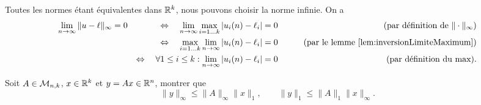 \proof
Toutes les normes étant équivalentes dans $\mathbb{R}^k$, nous pouvons choisir la norme infinie.
On a
\begin{align*}
  \lim_{n \to \infty} \|u - \ell\|_\infty & = 0 & 
  \Leftrightarrow \quad \lim_{n \to \infty} \max_{i=1 \dots k} |u_i(n) - \ell_i| & = 0 & \qquad \text{(par définition de $\|\cdot\|_\infty$)} \\
  & & \Leftrightarrow  \quad \max_{i=1 \dots k} \lim_{n \to \infty} |u_i(n) - \ell_i| & = 0 & \qquad \text{(par le lemme \ref{lem:inversionLimiteMaximum})} \\
  & & \Leftrightarrow  \quad \forall 1 \leq i \leq k: \lim_{n \to \infty} |u_i(n) - \ell_i| & = 0 & 
  \qquad \text{(par définition du max)}.
\end{align*}
\eproof

\begin{proposition} \label{prop:normeProduitMatriceVecteur}
  Soit $A \in \mathcal{M}_{n, k}$, $x \in \mathbb{R}^k$ et $y = Ax \in \mathbb{R}^n$, montrer que 
  $$
  \|y\|_\infty \leq \|A\|_\infty \|x\|_1, \qquad
  \|y\|_1 \leq \|A\|_1 \|x\|_\infty.
  $$
\end{proposition}

